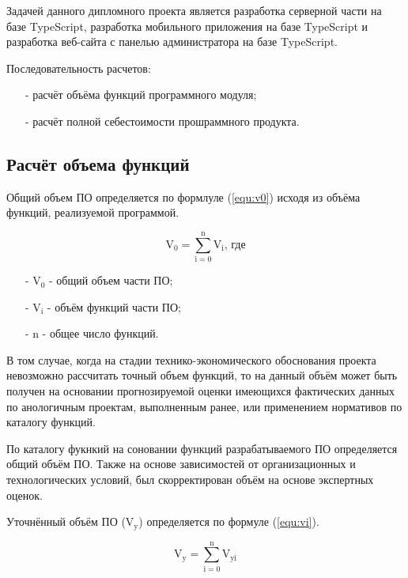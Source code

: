 Задачей данного дипломного проекта является
разработка серверной части на базе TypeScript,
разработка мобильного приложения на базе TypeScript
и разработка веб-сайта с панелью администратора на базе TypeScript.

Последовательность расчетов:

\begin{enumerate}
    \item[-] расчёт объёма функций программного модуля;
    \item[-] расчёт полной себестоимости прошраммного продукта.
\end{enumerate}

\subsection{Расчёт объема функций}

Общий объем ПО определяется по формлуле (\ref{equ:v0}) исходя из объёма функций, реализуемой программой.

\begin{equation}
    \label{equ:v0}
    \text{V}_0 = \sum^\text{n}_{\text{i}=0} \text{V}_\text{i} \text{, где}
\end{equation}

\begin{enumerate}
    \item[-] $\text{V}_0$ - общий объем части ПО; 
    \item[-] $\text{V}_\text{i}$ - объём функций части ПО;  
    \item[-] $\text{n}$ - общее число функций.
\end{enumerate}

В том случае, когда на стадии технико-экономического обоснования проекта невозможно рассчитать точный объем функций,
то на данный объём может быть получен на основании прогнозируемой оценки имеющихся фактических данных по анологичным проектам, выполненным ранее,
или применением нормативов по каталогу функций.

По каталогу фукнкий на соновании функций разрабатываемого ПО определяется общий объём ПО.
Также на основе зависимостей от организационных и технологических условий,
был скорректирован объём на основе экспертных оценок.

Уточнённый объём ПО ($\text{V}_\text{y}$) определяется по формуле (\ref{equ:vi}).

\begin{equation}
    \label{equ:vi}
    \text{V}_\text{y} = \sum^\text{n}_{\text{i}=0} \text{V}_\text{yi}
\end{equation}

